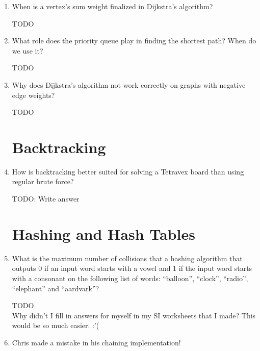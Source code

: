 \documentclass[11pt]{article}
\newenvironment{answer}{\large\lstset{basicstyle=\large}\color{white}}{}
\newenvironment{answer}{\large\lstset{basicstyle=\large}\color{red}}{}
\begin{document}
\begin{enumerate}
\item When is a vertex's sum weight  finalized in Dijkstra's algorithm?

    \begin{answer}
    \Huge TODO
    \end{answer}

\item What role does the priority queue play in finding the shortest path?
      When do we use it?

    \begin{answer}
    \Huge TODO
    \end{answer}

\item Why does Dijkstra's algorithm not work correctly on graphs with negative
      edge weights?

    \begin{answer}
    \Huge TODO
    \end{answer}

\section*{Backtracking}

\item How is backtracking better suited for solving a Tetravex board than
      using regular brute force?

    \begin{answer}
    \Huge TODO: Write answer
    \end{answer}

\section*{Hashing and Hash Tables}

\item What is the maximum number of collisions that a hashing algorithm that
      outputs 0 if an input word starts with a vowel and 1 if the input word
      starts with a consonant on the following list of words: ``balloon'',
      ``clock'', ``radio'', ``elephant'' and ``aardvark''?

    \begin{answer}
    \Huge TODO\\
    Why didn't I fill in answers for myself in my SI worksheets that I made?
    This would be so much easier. :'(
    \end{answer}

\item Chris made a mistake in his chaining implementation!


\end{enumerate}
\end{document}
